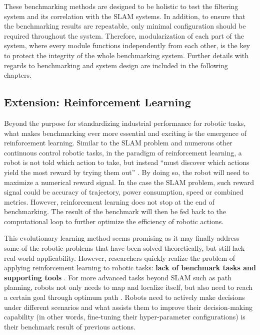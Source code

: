 These benchmarking methods are designed to be holistic to test the filtering system and its correlation with the SLAM systems. 
In addition, to ensure that the benchmarking results are repeatable, only minimal configuration should be required throughout the system. 
Therefore, modularization of each part of the system, where every module functions independently from each other, is the key to protect the integrity of the whole benchmarking system. 
Further details with regards to benchmarking and system design are included in the following chapters.

\subsection{Extension: Reinforcement Learning}

Beyond the purpose for standardizing industrial performance for robotic tasks, what makes benchmarking ever more essential and exciting is the emergence of reinforcement learning. 
Similar to the SLAM problem and numerous other continuous control robotic tasks, in the paradigm of reinforcement learning, a robot is not told which action to take, but instead “must discover which actions yield the most reward by trying them out” \cite{sutton2018reinforcement}. 
By doing so, the robot will need to maximize a numerical reward signal. 
In the case the SLAM problem, such reward signal could be accuracy of trajectory, power consumption, speed or combined metrics. 
However, reinforcement learning does not stop at the end of benchmarking. 
The result of the benchmark will then be fed back to the computational loop to further optimize the efficiency of robotic actions. 

This evolutionary learning method seems promising as it may finally address some of the robotic problems that have been solved theoretically, but still lack real-world applicability. 
However, researchers quickly realize the problem of applying reinforcement learning to robotic tasks: \textbf{lack of benchmark tasks and supporting tools} \cite{mahmood2018benchmarking}. 
For more advanced tasks beyond SLAM such as path planning, robots not only needs to map and localize itself, but also need to reach a certain goal through optimum path \cite{klancar2017path}. 
Robots need to actively make decisions under different scenarios and what assists them to improve their decision-making capability (in other words, fine-tuning their hyper-parameter configurations) is their benchmark result of previous actions. 

